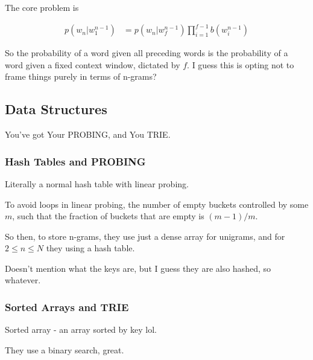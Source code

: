 \documentclass{article}
\begin{document}
	The core problem is
	
	\begin{align}
		p(w_n|w_1^{n-1}) &= p(w_n|w^{n-1}_f)\prod^{f-1}_{i=1}b(w^{n-1}_i)
	\end{align}
	
	So the probability of a word given all preceding words is the probability of a word given a fixed context window, dictated by $f$. I guess this is opting not to frame things purely in terms of n-grams?
	
	\subsection{Data Structures}
	
		You've got Your PROBING, and You TRIE.
		
		\subsubsection{Hash Tables and PROBING}
		
			Literally a normal hash table with linear probing.
			
			To avoid loops in linear probing, the number of empty buckets controlled by some $m$, such that the fraction of buckets that are empty is $(m-1)/m$.
			
			So then, to store n-grams, they use just a dense array for unigrams, and for $2\le n\le N$ they using a hash table.
			
			Doesn't mention what the keys are, but I guess they are also hashed, so whatever.
			
		\subsubsection{Sorted Arrays and TRIE}
		
			Sorted array - an array sorted by key lol.
			
			They use a binary search, great.

		
		
		
		
		
		
		
		
		
		
		
		
		
		
		
		
		
		
		
		
		
		
		
		
\end{document}
